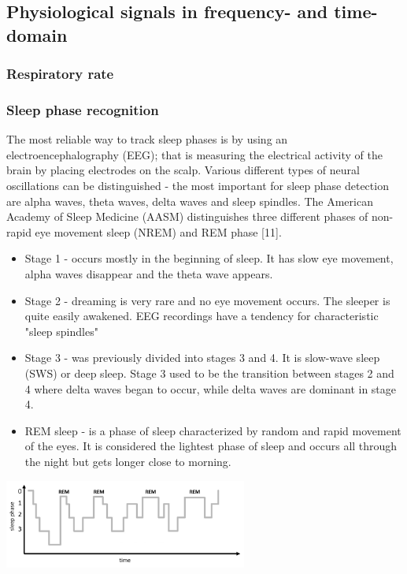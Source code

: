 \subsection{Physiological signals in frequency- and time-domain}
\subsubsection{Respiratory rate}
\subsubsection{Sleep phase recognition}
The most reliable way to track sleep phases is by using an electroencephalography (EEG); that is measuring the electrical activity of the brain by placing electrodes on the scalp. Various different types of neural oscillations can be distinguished - the most important for sleep phase detection are alpha waves, theta waves, delta waves and sleep spindles. The American Academy of Sleep Medicine (AASM) distinguishes three different phases of non-rapid eye movement sleep (NREM) and REM phase [11]. 
\begin{itemize}
\item Stage 1 - occurs mostly in the beginning of sleep. It has slow eye movement, alpha waves disappear and the theta wave appears. 
\item Stage 2 - dreaming is very rare and no eye movement occurs. The sleeper is quite easily awakened. EEG recordings have a tendency for characteristic "sleep spindles"
\item Stage 3 - was previously divided into stages 3 and 4. It is slow-wave sleep (SWS) or deep sleep. Stage 3 used to be the transition between stages 2 and 4 where delta waves began to occur, while delta waves are dominant in stage 4. 
\item REM sleep - is a phase of sleep characterized by random and rapid movement of the eyes. It is considered the lightest phase of sleep and occurs all through the night but gets longer close to morning.
\end{itemize}

\begin{minipage}{\linewidth}
\centering
\includegraphics[width=0.6\textwidth]{images/proc_phys_sleepphase}
\label{fig:proc_phys_sleepphase}
\end{minipage}

